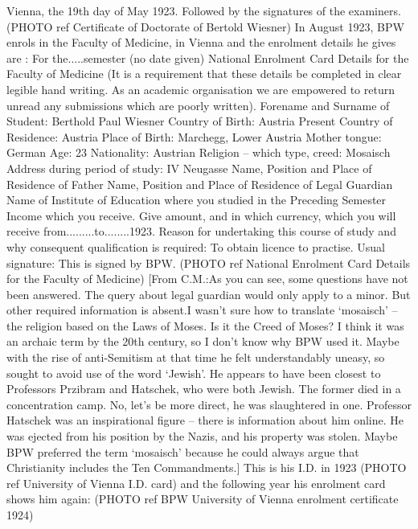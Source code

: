Vienna, the 19th day of May 1923.
Followed by the signatures of the examiners.
(PHOTO ref Certificate of Doctorate of Bertold Wiesner)
In August 1923, BPW enrols in the Faculty of Medicine, in Vienna and the enrolment details he
gives are :
For the.....semester (no date given) National Enrolment Card Details for the Faculty of Medicine (It
is a requirement that these details be completed in clear legible hand writing. As an academic
organisation we are empowered to return unread any submissions which are poorly written).
Forename and Surname of Student: Berthold Paul Wiesner Country of Birth: Austria
Present Country of Residence: Austria Place of Birth: Marchegg, Lower Austria
Mother tongue: German
Age: 23
Nationality: Austrian
Religion – which type, creed: Mosaisch
Address during period of study: IV Neugasse
Name, Position and Place of Residence of Father
Name, Position and Place of Residence of Legal Guardian
Name of Institute of Education where you studied in the Preceding Semester Income which you
receive. Give amount, and in which currency, which you will receive from.........to........1923.
Reason for undertaking this course of study and why consequent qualification is required: To obtain
licence to practise.
Usual signature: This is signed by BPW.
(PHOTO ref National Enrolment Card Details for the Faculty of Medicine)
[From C.M.:As you can see, some questions have not been answered. The query about legal
guardian would only apply to a minor. But other required information is absent.I wasn’t sure how to
translate ‘mosaisch’ – the religion based on the Laws of Moses. Is it the Creed of Moses? I think it
was an archaic term by the 20th century, so I don’t know why BPW used it. Maybe with the rise of
anti-Semitism at that time he felt understandably uneasy, so sought to avoid use of the word
‘Jewish’. He appears to have been closest to Professors Przibram and Hatschek, who were both
Jewish. The former died in a concentration camp. No, let’s be more direct, he was slaughtered in
one. Professor Hatschek was an inspirational figure – there is information about him online. He
was ejected from his position by the Nazis, and his property was stolen. Maybe BPW preferred the
term ‘mosaisch’ because he could always argue that Christianity includes the Ten Commandments.]
This is his I.D. in 1923 (PHOTO ref University of Vienna I.D. card) and the following year his
enrolment card shows him again: (PHOTO ref BPW University of Vienna enrolment certificate
1924)
